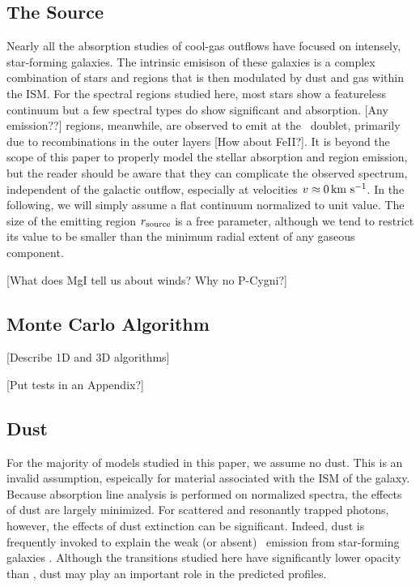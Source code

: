 \documentclass[12pt,preprint]{aastex}
\begin{document}
\subsection{The Source}

Nearly all the absorption studies of cool-gas outflows 
have focused on intensely, star-forming galaxies.  The
intrinsic emisison of these galaxies is a complex combination of
stars and  regions that is then modulated by dust and gas
within the ISM.  For the spectral regions studied
here, most stars show a featureless continuum but a few spectral
types do show significant  and  absorption.
[Any emission??]   regions, meanwhile, are observed to emit
at the \mgiid\ doublet, primarily due to recombinations in the outer
layers [How about FeII?].  It is beyond the scope of this paper to
properly model the 
stellar absorption and  region emission, but the reader
should be aware that they can complicate the observed spectrum,
independent of the galactic outflow, especially at velocities $v \approx 0 \, {\rm km~s^{-1}}$.
In the following, we will simply assume a flat continuum 
normalized to unit value.  The size of the emitting
region $r_{\rm source}$ is a free parameter, although we tend to
restrict its value to be smaller than the minimum radial extent of any
gaseous component.

[What does MgI tell us about winds?  Why no P-Cygni?]

\subsection{Monte Carlo Algorithm}

[Describe 1D and 3D algorithms]

[Put tests in an Appendix?]

\subsection{Dust}
\label{sec:dust_method}

For the majority of models studied in this paper, we assume no dust.
This is an invalid assumption, espeically for material associated with
the ISM of the galaxy.  Because absorption line analysis is performed
on normalized spectra, the effects of dust are largely minimized.  For
scattered and resonantly trapped photons, however, the effects of dust
extinction can be significant.  Indeed, dust is frequently invoked to
explain the weak (or absent) \lya\ emission from star-forming galaxies
\citep[e.g.][]{shapley03}.  Although the transitions studied here have
significantly lower opacity than \lya, dust may play an important role
in the predicted profiles.
\end{document}
